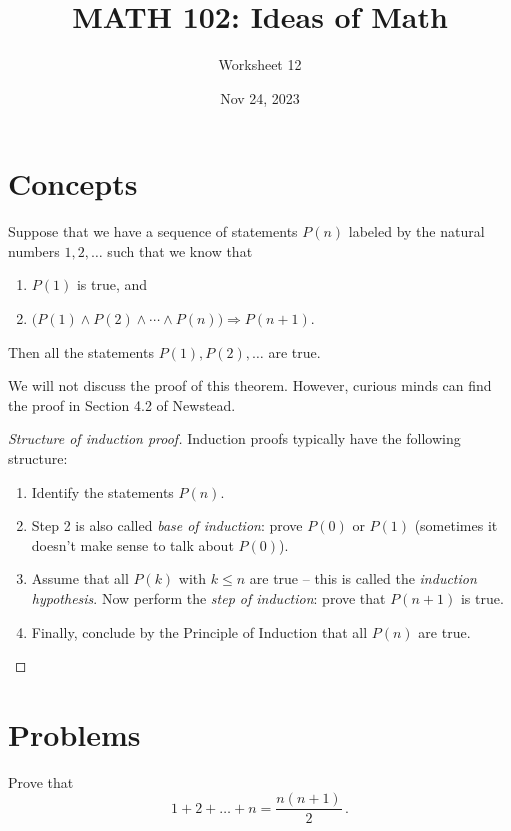 \documentclass[12pt]{amsart}
\title{ MATH 102: Ideas  of Math }
\author{ Worksheet 12 }
\date{Nov 24, 2023}
\begin{document}
\maketitle

\section{Concepts}


\begin{theorem}
Suppose that we have a sequence of statements $P(n)$ labeled by the natural numbers $1,2,\dots$ such that we know that 
\begin{enumerate}
    \item $P(1)$ is true, and
    \item $\big( P(1) \wedge P(2) \wedge \cdots \wedge P(n) \big) \Rightarrow P(n+1)$.
\end{enumerate}
  Then all the statements $P(1), P(2), \dots$ are true.
\end{theorem}
We will not discuss the proof of this theorem. However, curious minds can find the proof
in Section 4.2 of Newstead.

\begin{proof}[Structure of induction proof]
    Induction proofs typically have the following structure:
\begin{enumerate}
\item Identify the statements $P(n)$.
\item Step 2 is also called \emph{base of induction}: prove $P(0)$ or $P(1)$ (sometimes it doesn't make sense to talk about $P(0)$).
\item Assume that all $P(k)$ with $k\leq n$ are true -- this is called the \emph{induction hypothesis}. Now perform the \emph{step of induction}: prove that $P(n+1)$ is true.
\item Finally, conclude by the Principle of Induction that all $P(n)$ are true.
\end{enumerate}
\end{proof}


\section{Problems}

\begin{problem}
    Prove that 
    \begin{equation*}
        1+2+\dots + n = \frac{n(n+1)}{2} \,.
    \end{equation*}
\end{problem}
\end{document}
